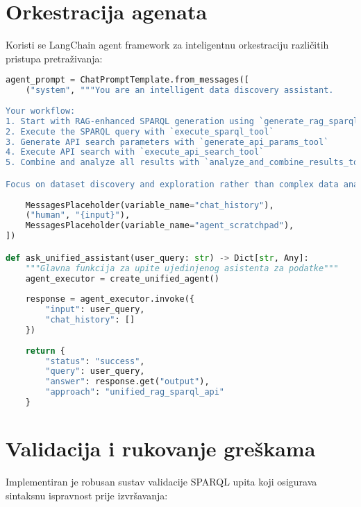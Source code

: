 \section{Orkestracija agenata}
\label{sec:agent_orchestration}

Koristi se LangChain agent framework za inteligentnu orkestraciju različitih pristupa pretraživanja:

\begin{lstlisting}[language=Python, caption=Orkestracija agenata - tijek rada]
agent_prompt = ChatPromptTemplate.from_messages([
    ("system", """You are an intelligent data discovery assistant.
    
Your workflow:
1. Start with RAG-enhanced SPARQL generation using `generate_rag_sparql_tool`
2. Execute the SPARQL query with `execute_sparql_tool`
3. Generate API search parameters with `generate_api_params_tool`  
4. Execute API search with `execute_api_search_tool`
5. Combine and analyze all results with `analyze_and_combine_results_tool`

Focus on dataset discovery and exploration rather than complex data analysis."""),
    
    MessagesPlaceholder(variable_name="chat_history"),
    ("human", "{input}"),
    MessagesPlaceholder(variable_name="agent_scratchpad"),
])

def ask_unified_assistant(user_query: str) -> Dict[str, Any]:
    """Glavna funkcija za upite ujedinjenog asistenta za podatke"""
    agent_executor = create_unified_agent()
    
    response = agent_executor.invoke({
        "input": user_query,
        "chat_history": []
    })
    
    return {
        "status": "success",
        "query": user_query,
        "answer": response.get("output"),
        "approach": "unified_rag_sparql_api"
    }
\end{lstlisting}

\section{Validacija i rukovanje greškama}
\label{sec:validation}

Implementiran je robusan sustav validacije SPARQL upita koji osigurava sintaksnu ispravnost prije izvršavanja:

